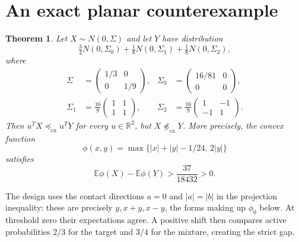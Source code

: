 \documentclass[11pt]{article}
\newtheorem{theorem}{Theorem}
\newcommand{\E}{\mathbb E}
\newcommand{\cx}{\preceq_{\mathrm{cx}}}
\begin{document}
\section{An exact planar counterexample}
\begin{theorem}\label{main}
Let $X\sim N(0,\Sigma)$ and let $Y$ have distribution
\[
 \tfrac34 N(0,\Sigma_0)+\tfrac18 N(0,\Sigma_1)+\tfrac18 N(0,\Sigma_2),
\]
where
\begin{align*}
 \Sigma&=\begin{pmatrix}1/3&0\\0&1/9\end{pmatrix},&
 \Sigma_0&=\begin{pmatrix}16/81&0\\0&0\end{pmatrix},\\
 \Sigma_1&=\frac{16}{9}\begin{pmatrix}1&1\\1&1\end{pmatrix},&
 \Sigma_2&=\frac{16}{9}\begin{pmatrix}1&-1\\-1&1\end{pmatrix}.
\end{align*}
Then $u^TX\cx u^TY$ for every $u\in\mathbb R^2$, but $X\not\cx Y$. More precisely, the convex function
\begin{equation}\label{witness}
 \phi(x,y)=\max\{|x|+|y|-1/24,\,2|y|\}
\end{equation}
satisfies
\begin{equation}\label{gap}
 \E\phi(X)-\E\phi(Y)>\frac{37}{18432}>0.
\end{equation}
\end{theorem}

The design uses the contact directions $a=0$ and $|a|=|b|$ in the projection inequality: these are precisely $y,x+y,x-y$, the forms making up $\phi_0$ below. At threshold zero their expectations agree. A positive shift then compares active probabilities $2/3$ for the target and $3/4$ for the mixture, creating the strict gap.
\end{document}

